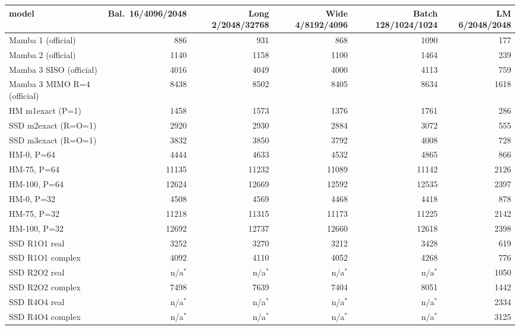 \begin{tabular}{l r r r r r }
\toprule
model & Bal.\ 16/4096/2048 & Long 2/2048/32768 & Wide 4/8192/4096 & Batch 128/1024/1024 & LM 6/2048/2048 \\
\midrule
Mamba 1 (official) & 886 & 931 & 868 & 1090 & 177 \\
Mamba 2 (official) & 1140 & 1158 & 1100 & 1464 & 239 \\
Mamba 3 SISO (official) & 4016 & 4049 & 4000 & 4113 & 759 \\
Mamba 3 MIMO R=4 (official) & 8438 & 8502 & 8405 & 8634 & 1618 \\
HM m1exact (P=1) & 1458 & 1573 & 1376 & 1761 & 286 \\
SSD m2exact (R=O=1) & 2920 & 2930 & 2884 & 3072 & 555 \\
SSD m3exact (R=O=1) & 3832 & 3850 & 3792 & 4008 & 728 \\
HM-0, P=64 & 4444 & 4633 & 4532 & 4865 & 866 \\
HM-75, P=64 & 11135 & 11232 & 11089 & 11142 & 2126 \\
HM-100, P=64 & 12624 & 12669 & 12592 & 12535 & 2397 \\
HM-0, P=32 & 4508 & 4569 & 4468 & 4418 & 878 \\
HM-75, P=32 & 11218 & 11315 & 11173 & 11225 & 2142 \\
HM-100, P=32 & 12692 & 12737 & 12660 & 12618 & 2398 \\
SSD R1O1 real & 3252 & 3270 & 3212 & 3428 & 619 \\
SSD R1O1 complex & 4092 & 4110 & 4052 & 4268 & 776 \\
SSD R2O2 real & n/a$^\ast$ & n/a$^\ast$ & n/a$^\ast$ & n/a$^\ast$ & 1050 \\
SSD R2O2 complex & 7498 & 7639 & 7404 & 8051 & 1442 \\
SSD R4O4 real & n/a$^\ast$ & n/a$^\ast$ & n/a$^\ast$ & n/a$^\ast$ & 2334 \\
SSD R4O4 complex & n/a$^\ast$ & n/a$^\ast$ & n/a$^\ast$ & n/a$^\ast$ & 3125 \\
\bottomrule
\end{tabular}

